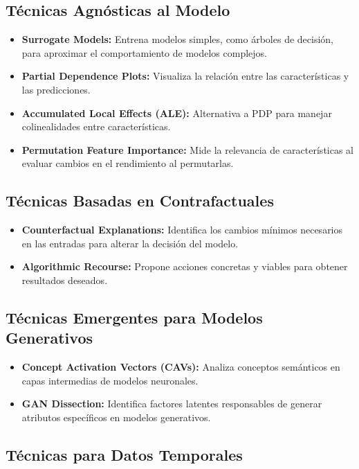 \begin{refsection}
\subsection{Técnicas Agnósticas al Modelo}
\begin{itemize}
    \item \textbf{Surrogate Models:} Entrena modelos simples, como árboles de decisión, para aproximar el comportamiento de modelos complejos.
    \item \textbf{Partial Dependence Plots:} Visualiza la relación entre las características y las predicciones.
    \item \textbf{Accumulated Local Effects (ALE):} Alternativa a PDP para manejar colinealidades entre características.
    \item \textbf{Permutation Feature Importance:} Mide la relevancia de características al evaluar cambios en el rendimiento al permutarlas.
\end{itemize}

\subsection{Técnicas Basadas en Contrafactuales}
\begin{itemize}
    \item \textbf{Counterfactual Explanations:} Identifica los cambios mínimos necesarios en las entradas para alterar la decisión del modelo.
    \item \textbf{Algorithmic Recourse:} Propone acciones concretas y viables para obtener resultados deseados.
\end{itemize}

\subsection{Técnicas Emergentes para Modelos Generativos}

\begin{itemize}
    \item \textbf{Concept Activation Vectors (CAVs):} Analiza conceptos semánticos en capas intermedias de modelos neuronales.
    \item \textbf{GAN Dissection:} Identifica factores latentes responsables de generar atributos específicos en modelos generativos.
\end{itemize}

\subsection{Técnicas para Datos Temporales}


\end{refsection}
